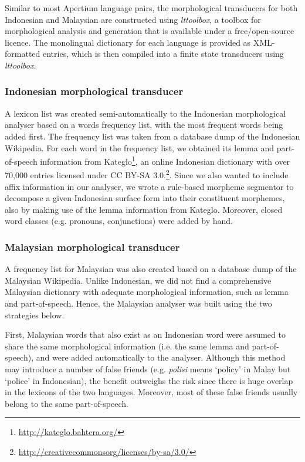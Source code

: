 \documentclass[10pt,a5paper,twoside]{article}
\begin{document}
Similar to most Apertium language pairs, the morphological transducers for both Indonesian and Malaysian are constructed using \emph{lttoolbox}, a toolbox for morphological analysis and generation that is available under a free/open-source licence. The monolingual dictionary for each language is provided as XML-formatted entries, which is then compiled into a finite state transducers using \emph{lttoolbox}.

\subsubsection{Indonesian morphological transducer}
A lexicon list was created semi-automatically to the Indonesian morphological analyser based on a words frequency list, with the most frequent words being added first. The frequency list was taken from a database dump of the Indonesian Wikipedia. For each word in the frequency list, we obtained its lemma and part-of-speech information from Kateglo\footnote{\url{http://kateglo.bahtera.org/}}, an online Indonesian dictionary with over 70,000 entries licensed under CC BY-SA 3.0.\footnote{\url{http://creativecommonsorg/licenses/by-sa/3.0/}}. Since we also wanted to include affix information in our analyser, we wrote a rule-based morpheme segmentor to decompose a given Indonesian surface form into their constituent morphemes, also by making use of the lemma information from Kateglo. Moreover, closed word classes (e.g. pronouns, conjunctions) were added by hand.

\subsubsection{Malaysian morphological transducer}
A frequency list for Malaysian was also created based on a database dump of the Malaysian Wikipedia. Unlike Indonesian, we did not find a comprehensive Malaysian dictionary with adequate morphological information, such as lemma and part-of-speech. Hence, the Malaysian analyser was built using the two strategies below.

First, Malaysian words that also exist as an Indonesian word were assumed to share the same morphological information (i.e. the same lemma and part-of-speech), and were added automatically to the analyser. Although this method may introduce a number of false friends (e.g. \emph{polisi} means `policy' in Malay but `police' in Indonesian), the benefit outweighs the risk since there is huge overlap in the lexicons of the two languages. Moreover, most of these false friends usually belong to the same part-of-speech.
\end{document}
